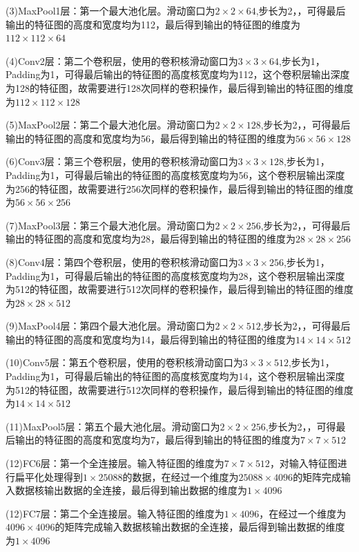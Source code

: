 \documentclass[openbib]{article}
\begin{document}
(3)MaxPool1层：第一个最大池化层。滑动窗口为$2\times2\times64$,步长为2，，可得最后输出的特征图的高度和宽度均为112，最后得到输出的特征图的维度为$112\times112\times64$

(4)Conv2层：第二个卷积层，使用的卷积核滑动窗口为$3\times3\times64$,步长为1，Padding为1，可得最后输出的特征图的高度核宽度均为112，这个卷积层输出深度为128的特征图，故需要进行128次同样的卷积操作，最后得到输出的特征图的维度为$112\times112\times128$

(5)MaxPool2层：第二个最大池化层。滑动窗口为$2\times2\times128$,步长为2，，可得最后输出的特征图的高度和宽度均为56，最后得到输出的特征图的维度为$56\times56\times128$

(6)Conv3层：第三个卷积层，使用的卷积核滑动窗口为$3\times3\times128$,步长为1，Padding为1，可得最后输出的特征图的高度核宽度均为56，这个卷积层输出深度为256的特征图，故需要进行256次同样的卷积操作，最后得到输出的特征图的维度为$56\times56\times256$

(7)MaxPool3层：第三个最大池化层。滑动窗口为$2\times2\times256$,步长为2，，可得最后输出的特征图的高度和宽度均为28，最后得到输出的特征图的维度为$28\times28\times256$

(8)Conv4层：第四个卷积层，使用的卷积核滑动窗口为$3\times3\times256$,步长为1，Padding为1，可得最后输出的特征图的高度核宽度均为28，这个卷积层输出深度为512的特征图，故需要进行512次同样的卷积操作，最后得到输出的特征图的维度为$28\times28\times512$

(9)MaxPool4层：第四个最大池化层。滑动窗口为$2\times2\times512$,步长为2，，可得最后输出的特征图的高度和宽度均为14，最后得到输出的特征图的维度为$14\times14\times512$

(10)Conv5层：第五个卷积层，使用的卷积核滑动窗口为$3\times3\times512$,步长为1，Padding为1，可得最后输出的特征图的高度核宽度均为14，这个卷积层输出深度为512的特征图，故需要进行512次同样的卷积操作，最后得到输出的特征图的维度为$14\times14\times512$

(11)MaxPool5层：第五个最大池化层。滑动窗口为$2\times2\times256$,步长为2，，可得最后输出的特征图的高度和宽度均为7，最后得到输出的特征图的维度为$7\times7\times512$

(12)FC6层：第一个全连接层。输入特征图的维度为$7\times7\times512$，对输入特征图进行扁平化处理得到$1\times25088$的数据，在经过一个维度为$25088\times4096$的矩阵完成输入数据核输出数据的全连接，最后得到输出数据的维度为$1\times4096$

(12)FC7层：第二个全连接层。输入特征图的维度为$1\times4096$，在经过一个维度为$4096\times4096$的矩阵完成输入数据核输出数据的全连接，最后得到输出数据的维度为$1\times4096$
\end{document}
